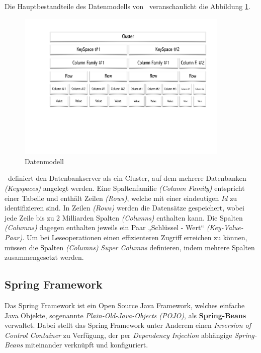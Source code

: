 Die Hauptbestandteile des Datenmodells von \cass\ veranschaulicht die Abbildung \ref{img:cassandraDataModel}.
\begin{figure}[H]
\centering
 \includegraphics[trim = 25mm 70mm 15mm 15mm, clip, width=0.9\textwidth]{resources/cassandra/cassandraDataModel}
\caption[Datenmodell]{Datenmodell}
\label{img:cassandraDataModel}
\end{figure}
\cass\ definiert den Datenbankserver als ein Cluster, auf dem mehrere Datenbanken \textit{(Keyspaces)} angelegt werden. Eine Spaltenfamilie \textit{(Column Family)} entspricht einer Tabelle und enthält Zeilen \textit{(Rows)}, welche mit einer eindeutigen \textit{Id} zu identifizieren sind. In Zeilen \textit{(Rows)} werden die Datensätze gespeichert, wobei jede Zeile bis zu 2 Milliarden Spalten \textit{(Columns)} enthalten kann. Die Spalten \textit{(Columns)} dagegen enthalten jeweils ein Paar „Schlüssel - Wert“ \textit{(Key-Value-Paar)}. 
Um bei Leseoperationen einen effizienteren Zugriff erreichen zu können, müssen die Spalten \textit{(Columns)} \textit{Super Columns} definieren, indem mehrere Spalten zusammengesetzt werden.

\subsection{Spring Framework}

Das Spring Framework ist ein Open Source Java Framework, welches einfache Java Objekte, sogenannte \textit{Plain-Old-Java-Objects (POJO)}, als \textbf{Spring-Beans} verwaltet. Dabei stellt das Spring Framework unter Anderem einen \textit{Inversion of Control Container} zu Verfügung, der per \textit{Dependency Injection} abhängige \textit{Spring-Beans} miteinander verknüpft und konfiguriert.

